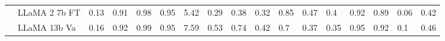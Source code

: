 \begin{table*}[t]
{\begin{tabular}{@{}ll|llll|llll|lll|ll|ll@{}}
                           & LLaMA 2 7b FT        & 0.13                                                                    & 0.91                                                                     & 0.98                                                                  & 0.95                                                                  & 5.42                                                                    & 0.29                                                                  & 0.38                                                                  & 0.32                                                                   & 0.85                                                                    & 0.47                                                                  & 0.4                                                                    & 0.92                                                                   & 0.89                                                                   & 0.06                                                                     & 0.42                                                                     \\
                           & LLaMA 13b Va         & 0.16                                                                    & 0.92                                                                     & 0.99                                                                  & 0.95                                                                  & 7.59                                                                    & 0.53                                                                  & 0.74                                                                  & 0.42                                                                   & 0.7                                                                     & 0.37                                                                  & 0.35                                                                   & 0.95                                                                   & 0.92                                                                   & 0.1                                                                      & 0.46                                                                     \\

\end{tabular}}
\end{table*}
